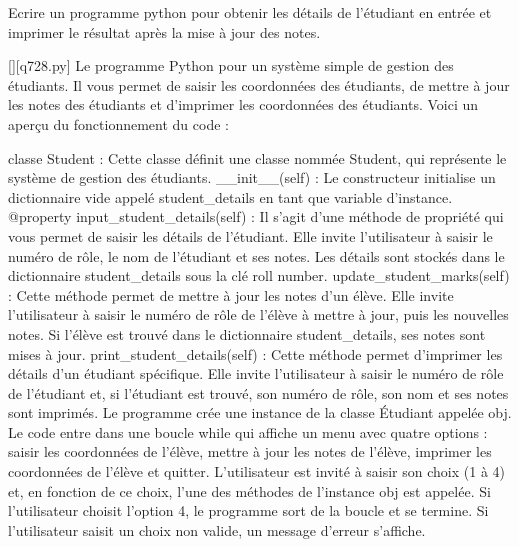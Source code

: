         \question
        Ecrire un programme python pour obtenir les détails de l'étudiant en entrée et imprimer le résultat après la mise à jour des notes.
        \par
        \begin{solution}
            \renewcommand{\nomfichier}{q728.py}
            \pythonfile{\chemincode \nomfichier}[][\nomfichier]
            Le programme Python pour un système simple de gestion des étudiants. Il vous permet de saisir les coordonnées des étudiants, de mettre à jour les notes des étudiants et d'imprimer les coordonnées des étudiants. Voici un aperçu du fonctionnement du code :

    classe Student : Cette classe définit une classe nommée Student, qui représente le système de gestion des étudiants.
    \_\_init\_\_(self) : Le constructeur initialise un dictionnaire vide appelé student\_details en tant que variable d'instance.
    @property input\_student\_details(self) : Il s'agit d'une méthode de propriété qui vous permet de saisir les détails de l'étudiant. Elle invite l'utilisateur à saisir le numéro de rôle, le nom de l'étudiant et ses notes. Les détails sont stockés dans le dictionnaire student\_details sous la clé roll number.
    update\_student\_marks(self) : Cette méthode permet de mettre à jour les notes d'un élève. Elle invite l'utilisateur à saisir le numéro de rôle de l'élève à mettre à jour, puis les nouvelles notes. Si l'élève est trouvé dans le dictionnaire student\_details, ses notes sont mises à jour.
    print\_student\_details(self) : Cette méthode permet d'imprimer les détails d'un étudiant spécifique. Elle invite l'utilisateur à saisir le numéro de rôle de l'étudiant et, si l'étudiant est trouvé, son numéro de rôle, son nom et ses notes sont imprimés.
    Le programme crée une instance de la classe Étudiant appelée obj.
    Le code entre dans une boucle while qui affiche un menu avec quatre options : saisir les coordonnées de l'élève, mettre à jour les notes de l'élève, imprimer les coordonnées de l'élève et quitter.
    L'utilisateur est invité à saisir son choix (1 à 4) et, en fonction de ce choix, l'une des méthodes de l'instance obj est appelée.
    Si l'utilisateur choisit l'option 4, le programme sort de la boucle et se termine.
    Si l'utilisateur saisit un choix non valide, un message d'erreur s'affiche.
        \end{solution}
        

